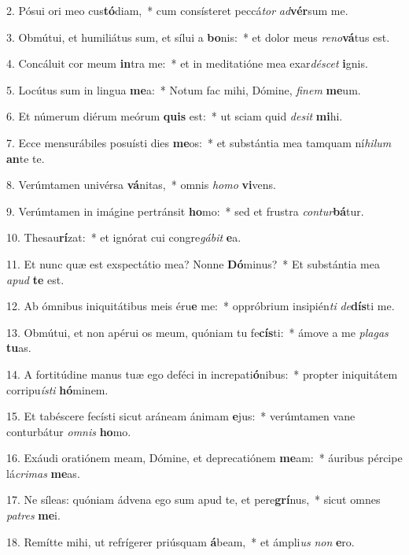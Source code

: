 2. Pósui ori meo cus\textbf{tó}diam,~*  cum consísteret peccá\textit{tor} \textit{ad}\textbf{vér}sum me.\

3. Obmútui, et humiliátus sum, et sílui a \textbf{bo}nis:~*  et dolor meus \textit{re}\textit{no}\textbf{vá}tus est.\

4. Concáluit cor meum \textbf{in}tra me:~*  et in meditatióne mea exar\textit{dé}\textit{scet} \textbf{i}gnis.\

5. Locútus sum in lingua \textbf{me}a:~*  Notum fac mihi, Dómine, \textit{fi}\textit{nem} \textbf{me}um.\

6. Et númerum diérum meórum \textbf{quis} est:~*  ut sciam quid \textit{de}\textit{sit} \textbf{mi}hi.\

7. Ecce mensurábiles posuísti dies \textbf{me}os:~*  et substántia mea tamquam ní\textit{hi}\textit{lum} \textbf{an}te te.\

8. Verúmtamen univérsa \textbf{vá}nitas,~*  omnis \textit{ho}\textit{mo} \textbf{vi}vens.\

9. Verúmtamen in imágine pertránsit \textbf{ho}mo:~*  sed et frustra \textit{con}\textit{tur}\textbf{bá}tur.\

10. Thesau\textbf{rí}zat:~*  et ignórat cui congre\textit{gá}\textit{bit} \textbf{e}a.\

11. Et nunc quæ est exspectátio mea? Nonne \textbf{Dó}minus?~*  Et substántia mea \textit{a}\textit{pud} \textbf{te} est.\

12. Ab ómnibus iniquitátibus meis éru\textbf{e} me:~*  oppróbrium insipién\textit{ti} \textit{de}\textbf{dís}ti me.\

13. Obmútui, et non apérui os meum, quóniam tu fe\textbf{cís}ti:~*  ámove a me \textit{pla}\textit{gas} \textbf{tu}as.\

14. A fortitúdine manus tuæ ego deféci in increpati\textbf{ó}nibus:~*  propter iniquitátem corripu\textit{ís}\textit{ti} \textbf{hó}minem.\

15. Et tabéscere fecísti sicut aráneam ánimam \textbf{e}jus:~*  verúmtamen vane conturbátur \textit{om}\textit{nis} \textbf{ho}mo.\

16. Exáudi oratiónem meam, Dómine, et deprecatiónem \textbf{me}am:~*  áuribus pércipe lá\textit{cri}\textit{mas} \textbf{me}as.\

17. Ne síleas: quóniam ádvena ego sum apud te, et pere\textbf{grí}nus,~*  sicut omnes \textit{pa}\textit{tres} \textbf{me}i.\

18. Remítte mihi, ut refrígerer priúsquam \textbf{á}beam,~*  et ámpli\textit{us} \textit{non} \textbf{e}ro.\

